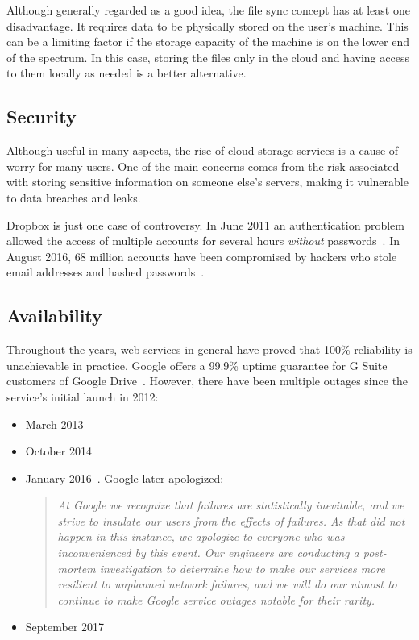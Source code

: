 Although generally regarded as a good idea, the file sync concept has at least one disadvantage. It requires data to be physically stored on the user's machine. This can be a limiting factor if the storage capacity of the machine is on the lower end of the spectrum. In this case, storing the files only in the cloud and having access to them locally as needed is a better alternative.

\subsection{Security}

Although useful in many aspects, the rise of cloud storage services is a cause of worry for many users. One of the main concerns comes from the risk associated with storing sensitive information on someone else's servers, making it vulnerable to data breaches and leaks.

Dropbox is just one case of controversy. In June 2011 an authentication problem allowed the access of multiple accounts for several hours \emph{without} passwords~\cite{dropbox_security_bug_made_passwords_optional_for_four_hours}. In August 2016, 68 million accounts have been compromised by hackers who stole email addresses and hashed passwords~\cite{dropbox_hackers_stole_email_addresses}.

\subsection{Availability}

Throughout the years, web services in general have proved that 100\% reliability is unachievable in practice. Google offers a 99.9\% uptime guarantee for G Suite customers of Google Drive~\cite{google_drive_reliability}. However, there have been multiple outages since the service's initial launch in 2012:

\begin{itemize}
  \itemsep0em
  \item March 2013~\cite{google_drive_experiencing_outage}
  \item October 2014~\cite{google_drive_and_docs_down}
  \item January 2016~\cite{gmail_google_drive_down}. Google later apologized:
    \begin{quote}
      \emph{At Google we recognize that failures are statistically inevitable, and we strive to insulate our users from the effects of failures. As that did not happen in this instance, we apologize to everyone who was inconvenienced by this event. Our engineers are conducting a post-mortem investigation to determine how to make our services more resilient to unplanned network failures, and we will do our utmost to continue to make Google service outages notable for their rarity.}~\cite{google_outage_apology}
    \end{quote}
  \item September 2017~\cite{google_suffered_a_meltdown}
\end{itemize}

